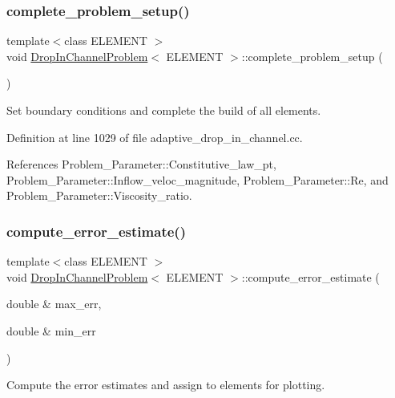 \subsubsection{\texorpdfstring{complete\+\_\+problem\+\_\+setup()}{complete\_problem\_setup()}}
{\footnotesize\ttfamily template$<$class E\+L\+E\+M\+E\+NT $>$ \\
void \hyperlink{classDropInChannelProblem}{Drop\+In\+Channel\+Problem}$<$ E\+L\+E\+M\+E\+NT $>$\+::complete\+\_\+problem\+\_\+setup (\begin{DoxyParamCaption}{ }\end{DoxyParamCaption})}



Set boundary conditions and complete the build of all elements. 



Definition at line 1029 of file adaptive\+\_\+drop\+\_\+in\+\_\+channel.\+cc.



References Problem\+\_\+\+Parameter\+::\+Constitutive\+\_\+law\+\_\+pt, Problem\+\_\+\+Parameter\+::\+Inflow\+\_\+veloc\+\_\+magnitude, Problem\+\_\+\+Parameter\+::\+Re, and Problem\+\_\+\+Parameter\+::\+Viscosity\+\_\+ratio.

\mbox{\label{classDropInChannelProblem_a49944969eb8dc6892cab3f1a9a2cb382}} 
\subsubsection{\texorpdfstring{compute\+\_\+error\+\_\+estimate()}{compute\_error\_estimate()}}
{\footnotesize\ttfamily template$<$class E\+L\+E\+M\+E\+NT $>$ \\
void \hyperlink{classDropInChannelProblem}{Drop\+In\+Channel\+Problem}$<$ E\+L\+E\+M\+E\+NT $>$\+::compute\+\_\+error\+\_\+estimate (\begin{DoxyParamCaption}\item[{double \&}]{max\+\_\+err,  }\item[{double \&}]{min\+\_\+err }\end{DoxyParamCaption})}



Compute the error estimates and assign to elements for plotting. 

